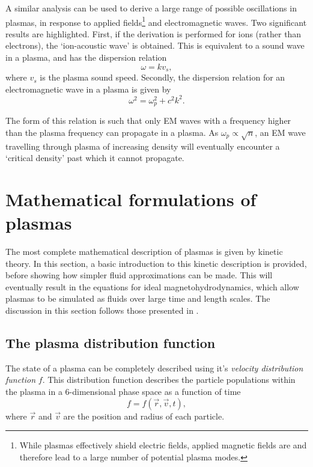 A similar analysis can be used to derive a large range of possible oscillations in plasmas, in response to applied fields\footnote{While plasmas effectively shield electric fields, applied magnetic fields are and therefore lead to a large number of potential plasma modes.} and electromagnetic waves. Two  significant results are highlighted. First, if the derivation is performed for ions (rather than electrons), the `ion-acoustic wave' is obtained. This is equivalent to a sound wave in a plasma, and has the dispersion relation
\begin{equation} \omega = k v_s, \end{equation} where $v_s$ is the plasma sound speed. Secondly, the dispersion relation for an electromagnetic wave in a plasma is given by 
\begin{equation} \omega^2 = \omega_p^2 + c^2k^2. \end{equation}

The form of this relation is such that only EM waves with a frequency higher than the plasma frequency can propagate in a plasma. As  $\omega_p \propto \sqrt{n}$, an EM wave travelling through plasma of increasing density will eventually encounter a `critical density' past which it cannot propagate. 

\section{Mathematical formulations of plasmas}
The most complete mathematical description of plasmas is given by kinetic theory. In this section, a basic introduction to this kinetic description is provided, before showing how simpler fluid approximations can be made. This will eventually result in the equations for ideal magnetohydrodynamics, which allow plasmas to be simulated as fluids over large time and length scales. The discussion in this section follows those presented in \cite{Chen2015, Piel2017, Belmont2019}.

\subsection{The plasma distribution function}
The state of a plasma can be completely described using it's \textit{velocity distribution function} $f$. This distribution function describes the particle populations within the plasma in a 6-dimensional phase space as a function of time
\begin{equation} f = f(\vec{r}, \vec{v}, t), \end{equation} 
where $\vec{r}$ and $\vec{v}$ are the position and radius of each particle. 

